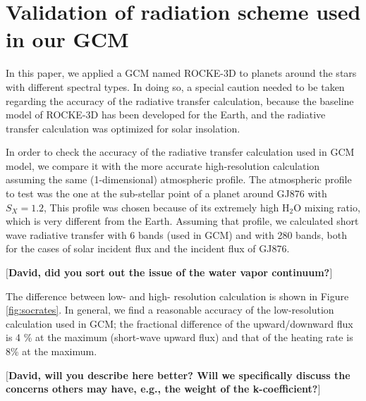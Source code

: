 \documentclass[11pt,numberedappendix,twocolappendix,]{emulateapj}
\def\water{H$_2$O }
\def\memo#1{\color{red}$[${\bf #1}$]$ \color{black}}
\begin{document}
\acknowledgments




\appendix


\section{Validation of radiation scheme used in our GCM}
\label{ap:radiation}

In this paper, we applied a GCM named ROCKE-3D to planets around the stars with different spectral types. 
In doing so, a special caution needed to be taken regarding the accuracy of the radiative transfer calculation, because the baseline model of ROCKE-3D has been developed for the Earth, and the radiative transfer calculation was optimized for solar insolation. 

In order to check the accuracy of the radiative transfer calculation used in GCM model, we compare it with the more accurate high-resolution calculation assuming the same (1-dimensional) atmospheric profile. 
The atmospheric profile to test was the one at the sub-stellar point of a planet around GJ876 with $S_X=1.2$, 
This profile was chosen because of its extremely high \water mixing ratio, which is very different from the Earth. 
Assuming that profile, we calculated short wave radiative transfer with 6 bands (used in GCM) and with 280 bands, both for the cases of solar incident flux and the incident flux of GJ876. 

\memo{David, did you sort out the issue of the water vapor continuum?}

The difference between low- and high- resolution calculation is shown in Figure \ref{fig:socrates}. 
In general, we find a reasonable accuracy of the low-resolution calculation used in GCM; the fractional difference of the upward/downward flux is 4 \% at the maximum (short-wave upward flux) and that of the heating rate is 8\% at the maximum. 

\memo{David, will you describe here better? Will we specifically discuss the concerns others may have, e.g., the weight of the k-coefficient?}
\end{document}
